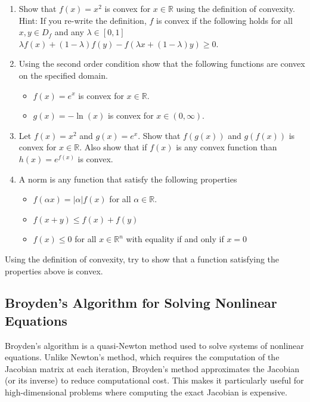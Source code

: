 \documentclass[%
oneside,                 %
final,                   %
10pt]{article}
\begin{document}
\begin{enumerate}
\item Show that $f(x)=x^2$ is convex for $x \in \mathbb{R}$ using the definition of convexity. Hint: If you re-write the definition, $f$ is convex if the following holds for all $x,y \in D_f$ and any $\lambda \in [0,1]$ $\lambda f(x)+(1-\lambda)f(y)-f(\lambda x + (1-\lambda) y ) \geq 0$.

\item Using the second order condition show that the following functions are convex on the specified domain.
\begin{itemize}

 \item $f(x) = e^x$ is convex for $x \in \mathbb{R}$.

 \item $g(x) = -\ln(x)$ is convex for $x \in (0,\infty)$.

\end{itemize}

\noindent
\item Let $f(x) = x^2$ and $g(x) = e^x$. Show that $f(g(x))$ and $g(f(x))$ is convex for $x \in \mathbb{R}$. Also show that if $f(x)$ is any convex function than $h(x) = e^{f(x)}$ is convex.

\item A norm is any function that satisfy the following properties
\begin{itemize}

 \item $f(\alpha x) = |\alpha| f(x)$ for all $\alpha \in \mathbb{R}$.

 \item $f(x+y) \leq f(x) + f(y)$

 \item $f(x) \leq 0$ for all $x \in \mathbb{R}^n$ with equality if and only if $x = 0$
\end{itemize}

\noindent
\end{enumerate}

\noindent
Using the definition of convexity, try to show that a function satisfying the properties above is convex.

\subsection*{Broyden’s Algorithm for Solving Nonlinear Equations}

Broyden’s algorithm is a quasi-Newton method used to solve systems of
nonlinear equations. Unlike Newton’s method, which requires the
computation of the Jacobian matrix at each iteration, Broyden’s method
approximates the Jacobian (or its inverse) to reduce computational
cost. This makes it particularly useful for high-dimensional problems
where computing the exact Jacobian is expensive.
\end{document}
